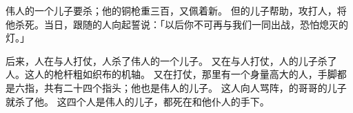 {伟人的一个儿子{}要杀{}；他的铜枪重三百{}，又佩着新{}。
但{}的儿子{}帮助{}，攻打{}人，将他杀死。当日，跟随{}的人向{}起誓说：「以后你不可再与我们一同出战，恐怕熄灭{}的灯。」
\par }{\PP {}后来，{}人在{}与{}人打仗，{}人{}杀了伟人的一个儿子{}。
又在{}与{}人打仗，{}人{}的儿子{}杀了{}人{}。这人的枪杆粗如织布的机轴。
又在{}打仗，那里有一个身量高大的人，手脚都是六指，共有二十四个指头；他也是伟人的儿子。
这人向{}人骂阵，{}的哥哥{}的儿子{}就杀了他。
这四个人是{}伟人的儿子，都死在{}和他仆人的手下。

}
